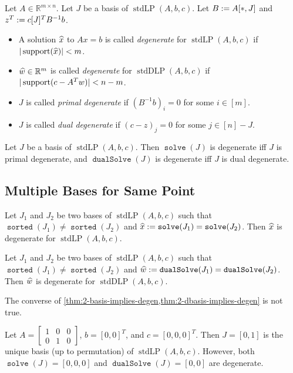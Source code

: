 \documentclass[a4paper, 12pt, fleqn]{article}
\DeclareMathOperator{\stdLP}{stdLP}
\DeclareMathOperator{\stdDLP}{stdDLP}
\DeclareMathOperator{\solve}{\mathtt{solve}}
\DeclareMathOperator{\dualSolve}{\mathtt{dualSolve}}
\DeclareMathOperator{\sorted}{\mathtt{sorted}}
\begin{document}
\begin{definition}[degeneracy]
Let $A \in \mathbb{R}^{m \times n}$. Let $J$ be a basis of $\stdLP(A, b, c)$.
Let $B := A[*,J]$ and $z^T := c[J]^TB^{-1}b$.
\begin{itemize}
\item A solution $\widehat{x}$ to $Ax = b$ is called \emph{degenerate}
    for $\stdLP(A, b, c)$ if $|\operatorname{support}(\widehat{x})| < m$.
\item $\widehat{w} \in \mathbb{R}^m$ is called \emph{degenerate}
    for $\stdDLP(A, b, c)$ if $|\operatorname{support}(c-A^Tw)| < n-m$.
\item $J$ is called \emph{primal degenerate} if $(B^{-1}b)_i = 0$ for some $i \in [m]$.
\item $J$ is called \emph{dual degenerate} if $(c-z)_j = 0$ for some $j \in [n] - J$.
\end{itemize}
\end{definition}

\begin{lemma}
Let $J$ be a basis of $\stdLP(A, b, c)$.
Then $\solve(J)$ is degenerate iff $J$ is primal degenerate,
and $\dualSolve(J)$ is degenerate iff $J$ is dual degenerate.
\end{lemma}

\subsection{Multiple Bases for Same Point}

\begin{lemma}
\label{thm:2-basis-implies-degen}
Let $J_1$ and $J_2$ be two bases of $\stdLP(A, b, c)$ such that
$\sorted(J_1) \neq \sorted(J_2)$ and $\xhat \defeq \solve(J_1) = \solve(J_2)$.
Then $\widehat{x}$ is degenerate for $\stdLP(A, b, c)$.
\end{lemma}

\begin{lemma}
\label{thm:2-dbasis-implies-degen}
Let $J_1$ and $J_2$ be two bases of $\stdLP(A, b, c)$ such that
$\sorted(J_1) \neq \sorted(J_2)$ and $\what \defeq \dualSolve(J_1) = \dualSolve(J_2)$.
Then $\widehat{w}$ is degenerate for $\stdDLP(A, b, c)$.
\end{lemma}

The converse of \cref{thm:2-basis-implies-degen,thm:2-dbasis-implies-degen} is not true.
\begin{example}
Let $A = \begin{bmatrix}1 & 0 & 0 \\ 0 & 1 & 0\end{bmatrix}$,
$b = [0, 0]^T$, and $c = [0, 0, 0]^T$.
Then $J = [0, 1]$ is the unique basis (up to permutation) of $\stdLP(A, b, c)$.
However, both $\solve(J) = [0, 0, 0]$ and $\dualSolve(J) = [0, 0]$ are degenerate.
\end{example}
\end{document}

